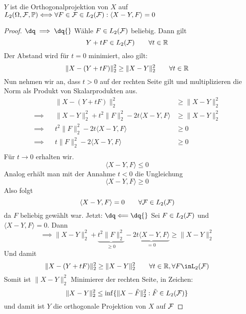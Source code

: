 \begin{proposition}\label{Prop1.3}
$Y$ ist die Orthogonalprojektion von $X$ auf $L_2(\Omega,\mathcal{F},\P)\\\Longleftrightarrow\forall F\in\mathcal{F}\in L_2(\mathcal{F}):\langle X-Y,F\rangle=0$
\end{proposition}
\begin{proof}
	$\dq \implies \dq{}$ \enter
	Wähle $F \in L_2(\F)$ beliebig. Dann gilt
	\[Y + tF \in L_2(\F) \qquad \forall t \in \R\]
	Der Abstand wird für $t=0$ minimiert, also gilt:
\[\|X-(Y+tF)\|_2^2 \geq \|X-Y\|_2^2 \qquad \forall t \in \R\]
Nun nehmen wir an, dass $t>0$ auf der rechten Seite gilt und multiplizieren die Norm als Produkt von Skalarprodukten aus.
\begin{align*}
	&&\|X-(Y+tF)\|_2^2 &\geq \|X-Y\|_2^2 \\
	\implies	&&\|X-Y\|_2^2 + t^2\|F\|_2^2 - 2t\langle X-Y, F \rangle &\geq \|X-Y\|_2^2 \\
	\implies	&&t^2\|F\|_2^2 - 2t\langle X-Y, F \rangle &\geq 0 \\
	\implies	&&t\|F\|_2^2 - 2\langle X-Y, F \rangle &\geq 0 \\
\end{align*}
Für $t\rightarrow0$ erhalten wir.
\[\langle X-Y, F \rangle \leq 0\]
Analog erhält man mit der Annahme $t<0$ die Ungleichung
\[\langle X-Y, F \rangle \geq 0\]
Also folgt
\[\langle X-Y, F \rangle = 0 \qquad \forall \F \in L_2(\F)\]
da $F$ beliebig gewählt war.\enter\enter
Jetzt: $\dq \Longleftarrow \dq{}$ \enter
Sei $F\in L_2(\F)$ und $\langle X-Y, F \rangle = 0$. Dann
\[\implies \|X-Y\|_2^2 + \underbrace{t^2\|F\|_2^2}_{\geq 0} - \underbrace{2t\langle X-Y, F \rangle}_{=0} \geq \|X-Y\|_2^2\]
Und damit 
\[\|X-(Y+tF)\|_2^2 \geq \|X-Y\|_2^2 \qquad \forall t\in\R, \forall F\inL_2(\F)\]
Somit ist $\|X-Y\|_2^2$ Minimierer der rechten Seite, in Zeichen:
\[\|X-Y\|_2^2 \leq \inf\{\|X-\tilde{F}\|_2^2 : \tilde{F}\in L_2(\F)\}\]
und damit ist $Y$ die orthogonale Projektion von $X$ auf $\F$
\end{proof}

